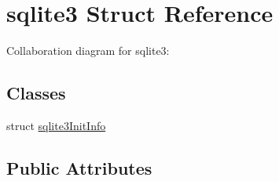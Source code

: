 \hypertarget{structsqlite3}{\section{sqlite3 Struct Reference}
\label{structsqlite3}
}


Collaboration diagram for sqlite3\+:
\subsection*{Classes}
\begin{DoxyCompactItemize}
\item 
struct \hyperlink{structsqlite3_1_1sqlite3_init_info}{sqlite3\+Init\+Info}
\end{DoxyCompactItemize}
\subsection*{Public Attributes}

